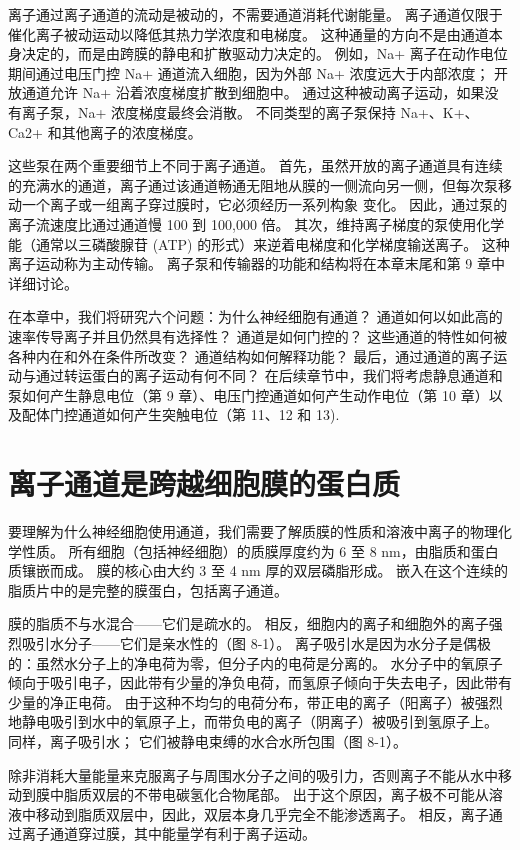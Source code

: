 离子通过离子通道的流动是被动的，不需要通道消耗代谢能量。 离子通道仅限于催化离子被动运动以降低其热力学浓度和电梯度。 这种通量的方向不是由通道本身决定的，而是由跨膜的静电和扩散驱动力决定的。 例如，Na+ 离子在动作电位期间通过电压门控 Na+ 通道流入细胞，因为外部 Na+ 浓度远大于内部浓度； 开放通道允许 Na+ 沿着浓度梯度扩散到细胞中。 通过这种被动离子运动，如果没有离子泵，Na+ 浓度梯度最终会消散。 不同类型的离子泵保持 Na+、K+、Ca2+ 和其他离子的浓度梯度。

这些泵在两个重要细节上不同于离子通道。 首先，虽然开放的离子通道具有连续的充满水的通道，离子通过该通道畅通无阻地从膜的一侧流向另一侧，但每次泵移动一个离子或一组离子穿过膜时，它必须经历一系列构象 变化。 因此，通过泵的离子流速度比通过通道慢 100 到 100,000 倍。 其次，维持离子梯度的泵使用化学能（通常以三磷酸腺苷 (ATP) 的形式）来逆着电梯度和化学梯度输送离子。 这种离子运动称为主动传输。 离子泵和传输器的功能和结构将在本章末尾和第 9 章中详细讨论。

在本章中，我们将研究六个问题：为什么神经细胞有通道？ 通道如何以如此高的速率传导离子并且仍然具有选择性？ 通道是如何门控的？ 这些通道的特性如何被各种内在和外在条件所改变？ 通道结构如何解释功能？ 最后，通过通道的离子运动与通过转运蛋白的离子运动有何不同？ 在后续章节中，我们将考虑静息通道和泵如何产生静息电位（第 9 章）、电压门控通道如何产生动作电位（第 10 章）以及配体门控通道如何产生突触电位（第 11、12 和 13).

\section{离子通道是跨越细胞膜的蛋白质}
要理解为什么神经细胞使用通道，我们需要了解质膜的性质和溶液中离子的物理化学性质。 所有细胞（包括神经细胞）的质膜厚度约为 6 至 8 nm，由脂质和蛋白质镶嵌而成。 膜的核心由大约 3 至 4 nm 厚的双层磷脂形成。 嵌入在这个连续的脂质片中的是完整的膜蛋白，包括离子通道。

膜的脂质不与水混合——它们是疏水的。 相反，细胞内的离子和细胞外的离子强烈吸引水分子——它们是亲水性的（图 8-1）。 离子吸引水是因为水分子是偶极的：虽然水分子上的净电荷为零，但分子内的电荷是分离的。 水分子中的氧原子倾向于吸引电子，因此带有少量的净负电荷，而氢原子倾向于失去电子，因此带有少量的净正电荷。 由于这种不均匀的电荷分布，带正电的离子（阳离子）被强烈地静电吸引到水中的氧原子上，而带负电的离子（阴离子）被吸引到氢原子上。 同样，离子吸引水； 它们被静电束缚的水合水所包围（图 8-1）。

除非消耗大量能量来克服离子与周围水分子之间的吸引力，否则离子不能从水中移动到膜中脂质双层的不带电碳氢化合物尾部。 出于这个原因，离子极不可能从溶液中移动到脂质双层中，因此，双层本身几乎完全不能渗透离子。 相反，离子通过离子通道穿过膜，其中能量学有利于离子运动。

